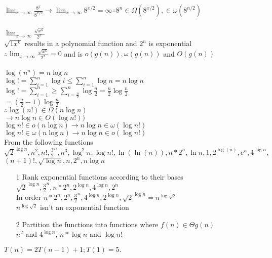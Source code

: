 \documentclass[12pt,largemargins]{homework}
\begin{document}
$\lim_{x\to\infty}\frac{8^x}{8^{x/2}}\rightarrow\lim_{x\to\infty}8^{x/2}=\infty\therefore 8^n \in \Omega (8^{x/2}), \in \omega(8^{n/2})$\\
\\
$\lim_{x\to\infty} \frac{\sqrt{x^k}}{2^x}$\\
$\sqrt{1x^k}$ results in a polynomial function and $2^n$ is exponential\\
$\therefore \lim_{x\to\infty} \frac{\sqrt{x^k}}{2^x} = 0$ and is $o(g(n)), \omega (g(n))$ and $O(g(n))$\\
\\
$\log(n^n) = n \log n $\\
$ \log ! = \sum_{i=1}^{n} \log i \leq \sum_{i=1}^{n} \log n = n \log n $\\
$  \log ! = \sum_{i=1}^{n} \geq \sum_{i=\frac{n}{2}}^{n} \log \frac{n}{2} = \frac{n}{2} \log \frac{n}{2} $\\
$ =(\frac{n}{2} -1)\log \frac{n}{2}$\\
$  \therefore \log(n!) \in \Omega(n \log n)$\\
$ \rightarrow n \log n \in O(\log n!))  $\\
$ \log n! \in o(n \log n) \rightarrow n \log n \in \omega( \log n!)$\\
$ \log n! \in \omega(n \log n) \rightarrow n \log n \in o( \log n!)$\\
\newpage
\question
From the following functions \\$ \sqrt{2}^{\log n},n^2,n!,\frac{3}{2}^n,n^3,\log^2 n, \log n!, \ln(\ln(n)), n*2^n, \ln n, 1,2^{\log(n)}, e^n, 4^{\log n},$ \\ $ (n+1)!, \sqrt{\log n}, n, 2^n,  n \log n$\\
\begin{itemize}
	\item[1] 
	Rank exponential functions according to their bases\\
	$  \sqrt{2}^{\log n}, \frac{3}{2}^n,  n*2^n,2^{\log n}, 4^{\log n}, 2^n$\\
	In order $ n*2^n, 2^n, \frac{3}{2}^n, 4^{\log n},2^{\log n},\sqrt{2}^{\log n}  = n^{\log \sqrt{2}}$\\
	$ n^{\log \sqrt{2}} $ isn't an exponential function\\
	\item[2]
	Partition the functions into functions where $ f(n)\in \Theta g(n) $\\
	$ n^2 $ and $ 4^{\log n} $, $ n* \log n $ and $ \log n! $
\end{itemize}
\question
$T ( n ) = 2 T ( n-1 ) + 1 ; T ( 1 ) = 5 .$\\
\end{document}
